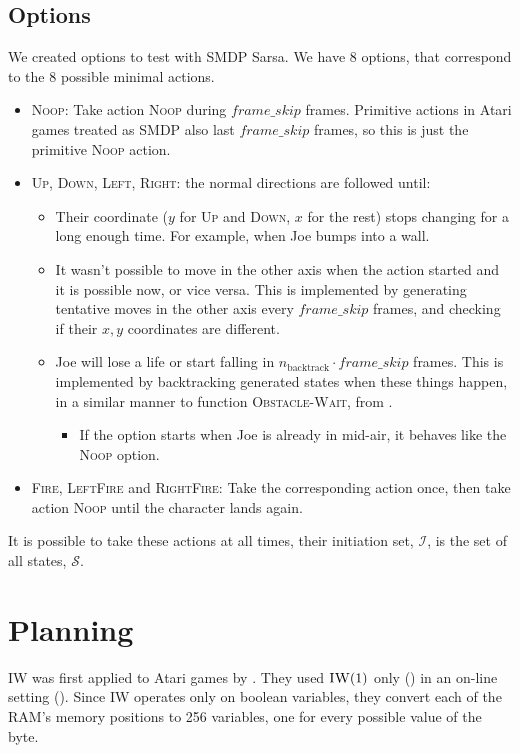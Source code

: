 \subsection{Options}
We created options to test with \ac{SMDP} Sarsa. We have 8 options, that
correspond to the 8 possible minimal actions.
\begin{itemize}
  \item \textsc{Noop}: Take action \textsc{Noop} during $frame\_skip$ frames.
    Primitive actions in Atari games treated as \ac{SMDP} also last
    $frame\_skip$ frames, so this is just the primitive \textsc{Noop} action.
  \item \textsc{Up}, \textsc{Down}, \textsc{Left}, \textsc{Right}: the normal
    directions are followed until:
    \begin{itemize}
      \item Their coordinate ($y$ for \textsc{Up} and \textsc{Down}, $x$ for the
        rest) stops changing for a long enough time. For example, when Joe bumps
into a wall.
      \item It wasn't possible to move in the other axis when the action started
        and it is possible now, or vice versa. This is implemented by generating
        tentative moves in the other axis every $frame\_skip$ frames, and
        checking if their $x,y$ coordinates are different.
      \item Joe will lose a life or start falling in $n_{\text{backtrack}} \cdot
        frame\_skip$ frames. This is implemented by backtracking generated
        states when these things happen, in a similar manner to function
        \textsc{Obstacle-Wait}, from .
        \begin{itemize}
          \item If the option starts when Joe is already in mid-air, it behaves
            like the \textsc{Noop} option.
        \end{itemize}
    \end{itemize}
  \item \textsc{Fire}, \textsc{LeftFire} and \textsc{RightFire}: Take the
    corresponding action once, then take action \textsc{Noop} until the
    character lands again.
\end{itemize}

It is possible to take these actions at all times, their initiation set,
$\mathcal{I}$, is the set of all states, $\mathcal{S}$.

\section{Planning}
\acl{IW} was first applied to Atari games by \citet{lipovetzky2015classical}.
They used $\textsc{IW}(1)$ only () in an on-line
setting (). Since \ac{IW} operates only on boolean
variables, they convert each of the \ac{RAM}'s memory positions to 256
variables, one for every possible value of the byte.

